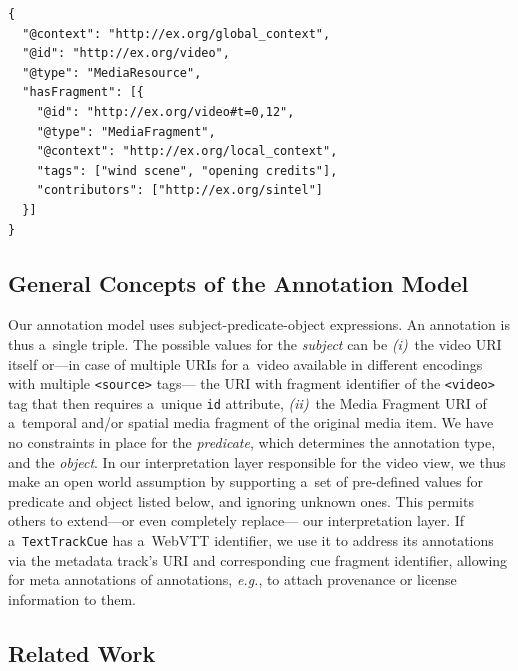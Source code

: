 \documentclass[runningheads,a4paper]{llncs}
\newcommand{\inlinelistingsize}{\fontsize{8pt}{11pt}}
\let\oldurl\url
\renewcommand{\url}[1]{\inlinelistingsize\oldurl{#1}}
\def\JSONLD{\mbox{JSON-LD}}
\def\JSONLD{\mbox{JSON-LD}}
\begin{document}
\begin{lstlisting}[caption={Generated \JSONLD~for the Web of Data, see
    \url{http://bit.ly/webvtt-jsonld} for the RDF triples},
  label=listing:jsonld, float=t!]
{
  "@context": "http://ex.org/global_context",
  "@id": "http://ex.org/video",
  "@type": "MediaResource",
  "hasFragment": [{
    "@id": "http://ex.org/video#t=0,12",
    "@type": "MediaFragment",
    "@context": "http://ex.org/local_context",
    "tags": ["wind scene", "opening credits"],
    "contributors": ["http://ex.org/sintel"]
  }]
}
\end{lstlisting}

\subsection{General Concepts of the Annotation Model}

Our annotation model uses subject-predicate-object expressions.
An annotation is thus a~single triple.
The possible values for the \emph{subject} can be \emph{(i)}~the video
URI itself or---in case of multiple URIs for a~video available
in different encodings with multiple \texttt{<source>} tags---%
the URI with fragment identifier of the \texttt{<video>} tag
that then requires a~unique \texttt{id} attribute,
\emph{(ii)}~the Media Fragment URI of a~temporal and/or spatial
media fragment of the original media item.
We have no constraints in place for the \emph{predicate},
which determines the annotation type, and the \emph{object}.
In our interpretation layer responsible for the video view,
we thus make an open world assumption
by supporting a~set of pre-defined values for predicate and object
listed below, and ignoring unknown ones.
This permits others to extend---or even completely replace---%
our interpretation layer.
If a~\texttt{TextTrackCue} has a~WebVTT identifier,
we use it to address its annotations
via the metadata track's URI
and corresponding cue fragment identifier,
allowing for meta annotations of annotations, \emph{e.g.},
to attach provenance or license information to them.

\subsection{Related Work}
\end{document}
